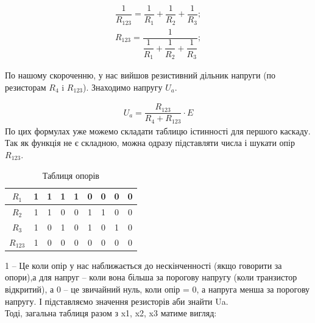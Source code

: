 \documentclass[a4paper,14pt]{extreport}
\begin{document}
\begin{align}
  \dfrac{1}{R_{123}} = \dfrac{1}{R_{1}}+\dfrac{1}{R_{2}} + \dfrac{1}{R_3};\\
  R_{123} = \dfrac{1}{\dfrac{1}{R_{1}}+\dfrac{1}{R_{2}} + \dfrac{1}{R_3}};
\end{align}










\clearpage
По нашому скороченню, у нас вийшов резистивний дільник напруги (по резисторам $R_{4}$ i $R_{123}$). Знаходимо напругу $U_a$.

\begin{align}
  U_a = \dfrac{R_{123}}{R_{4} + R_{123}} \cdot E
\end{align}
По цих формулах уже можемо складати таблицю істинності для першого каскаду. Так як функція не є складною, можна одразу підставляти числа і шукати опір $R_{123}$.

\begin{table}[h]
\caption{Таблиця опорів}
  \begin{center}
    \begin{tabular}{|c|c|c|c|c|c|c|c|c|}
    \hline
    $R_1 $  & 1 & 1 & 1 & 1 & 0 & 0 & 0 & 0 \\ \hline
    $R_2 $  & 1 & 1 & 0 & 0 & 1 & 1 & 0 & 0 \\ \hline
    $R_3 $  & 1 & 0 & 1 & 0 & 1 & 0 & 1 & 0 \\ \hline
$R_{123} $  & 1 & 0 & 0 & 0 & 0 & 0 & 0 & 0\\ \hline
    \end{tabular}
  \end{center}
\end{table}

1 – Це коли опір у нас наближається до нескінченності (якщо говорити за опори),а для напруг – коли вона більша за порогову напругу (коли транзистор відкритий), а 0 – це звичайний нуль, коли опір = 0, а напруга менша за порогову напругу. І підставляємо значення резисторів аби знайти Ua.\\

Тоді, загальна таблиця разом з x1, x2, x3 матиме вигляд:
\end{document}
